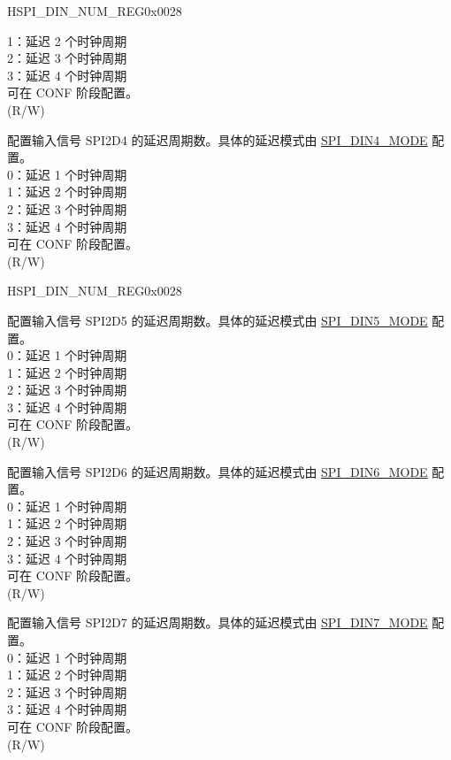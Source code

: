 \begin{register}{H}{SPI\_DIN\_NUM\_REG}{0x0028}
\begin{regdesc}
\begin{reglist}
1：延迟 2 个时钟周期\\
2：延迟 3 个时钟周期\\
3：延迟 4 个时钟周期\\
可在 CONF 阶段配置。\\
(R/W)
\label{fielddesc:SPIDIN4NUM}\item [SPI\_DIN4\_NUM] 配置输入信号 SPI2D4 的延迟周期数。具体的延迟模式由 \hyperref[fielddesc:SPIDIN4MODE]{SPI\_DIN4\_MODE} 配置。\\
0：延迟 1 个时钟周期\\
1：延迟 2 个时钟周期\\
2：延迟 3 个时钟周期\\
3：延迟 4 个时钟周期\\
可在 CONF 阶段配置。\\
(R/W)
 \item [见下页]
\end{reglist}\end{regdesc}
\end{register}

\addtocounter{Regfloat}{-1}
\begin{register}{H}{SPI\_DIN\_NUM\_REG}{0x0028}
\begin{regdesc}\begin{reglist}
\item [接上页]
\label{fielddesc:SPIDIN5NUM}\item [SPI\_DIN5\_NUM] 配置输入信号 SPI2D5 的延迟周期数。具体的延迟模式由 \hyperref[fielddesc:SPIDIN5MODE]{SPI\_DIN5\_MODE} 配置。\\
0：延迟 1 个时钟周期\\
1：延迟 2 个时钟周期\\
2：延迟 3 个时钟周期\\
3：延迟 4 个时钟周期\\
可在 CONF 阶段配置。\\
(R/W)
\label{fielddesc:SPIDIN6NUM}\item [SPI\_DIN6\_NUM] 配置输入信号 SPI2D6 的延迟周期数。具体的延迟模式由 \hyperref[fielddesc:SPIDIN6MODE]{SPI\_DIN6\_MODE} 配置。\\
0：延迟 1 个时钟周期\\
1：延迟 2 个时钟周期\\
2：延迟 3 个时钟周期\\
3：延迟 4 个时钟周期\\
可在 CONF 阶段配置。\\
(R/W)
\label{fielddesc:SPIDIN7NUM}\item [SPI\_DIN7\_NUM] 配置输入信号 SPI2D7 的延迟周期数。具体的延迟模式由 \hyperref[fielddesc:SPIDIN7MODE]{SPI\_DIN7\_MODE} 配置。\\
0：延迟 1 个时钟周期\\
1：延迟 2 个时钟周期\\
2：延迟 3 个时钟周期\\
3：延迟 4 个时钟周期\\
可在 CONF 阶段配置。\\
(R/W)
\end{reglist}\end{regdesc}
\end{register}


